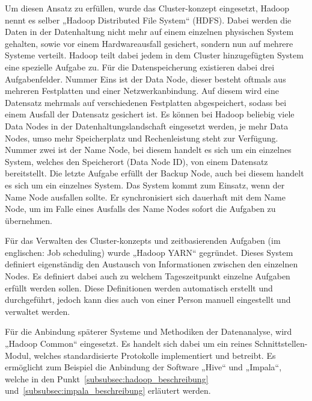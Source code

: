Um diesen Ansatz zu erfüllen, wurde das Cluster-konzept eingesetzt, Hadoop nennt
es selber „Hadoop Distributed File System“ (HDFS). Dabei werden die Daten in
der Datenhaltung nicht mehr auf einem einzelnen physischen System gehalten,
sowie vor einem Hardwareausfall gesichert, sondern nun auf mehrere Systeme
verteilt. Hadoop teilt dabei jedem in dem Cluster hinzugefügten System eine
spezielle Aufgabe zu. Für die Datenspeicherung existieren dabei drei
Aufgabenfelder. Nummer Eins ist der Data Node, dieser besteht oftmals aus
mehreren Festplatten und einer Netzwerkanbindung. Auf diesem wird eine
Datensatz mehrmals auf verschiedenen Festplatten abgespeichert, sodass bei
einem Ausfall der Datensatz gesichert ist. Es können bei Hadoop beliebig viele
Data Nodes in der Datenhaltungslandschaft eingesetzt werden, je mehr Data
Nodes, umso mehr Speicherplatz und Rechenleistung steht zur Verfügung. Nummer
zwei ist der Name Node, bei diesem handelt es sich um ein einzelnes System,
welches den Speicherort (Data Node ID), von einem Datensatz bereitstellt. Die
letzte Aufgabe erfüllt der Backup Node, auch bei diesem handelt es sich um ein
einzelnes System. Das System kommt zum Einsatz, wenn der Name Node ausfallen
sollte. Er synchronisiert sich dauerhaft mit dem Name Node, um im Falle eines
Ausfalls des Name Nodes sofort die Aufgaben zu übernehmen.

Für das Verwalten des Cluster-konzepts und zeitbasierenden Aufgaben (im
englischen: Job scheduling) wurde „Hadoop YARN“ gegründet. Dieses System
definiert eigenständig den Austausch von Informationen zwischen den einzelnen
Nodes. Es definiert dabei auch zu welchem Tageszeitpunkt einzelne Aufgaben
erfüllt werden sollen. Diese Definitionen werden automatisch erstellt und
durchgeführt, jedoch kann dies auch von einer Person manuell eingestellt und
verwaltet werden.

Für die Anbindung späterer Systeme und Methodiken der Datenanalyse, wird
„Hadoop Common“ eingesetzt. Es handelt sich dabei um ein reines
Schnittstellen-Modul, welches standardisierte Protokolle implementiert und
betreibt. Es ermöglicht zum Beispiel die Anbindung der Software „Hive“ und
„Impala“, welche in den Punkt~\ref{subsubsec:hadoop_beschreibung}
und~\ref{subsubsec:impala_beschreibung} erläutert werden.

